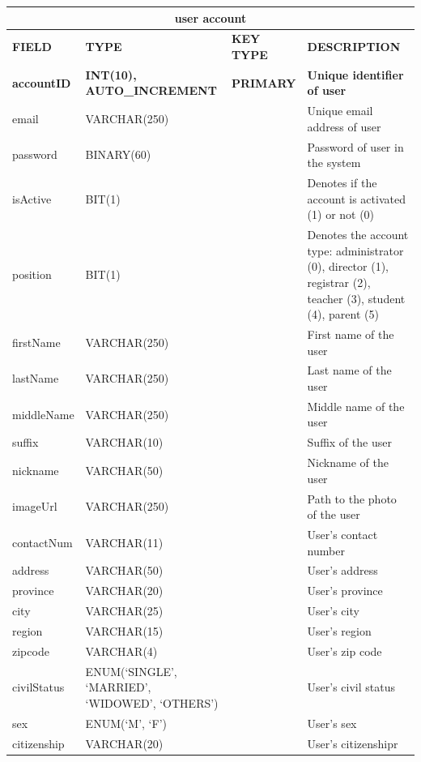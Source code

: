 \documentclass[11pt,a4paper,titlepage]{article}
\begin{document}
\vspace{1cm}
\begin{longtable}{ |p{2.5cm}|p{4.5cm}|p{2.5cm}|p{3cm}|  }
    \hline
    \multicolumn{4}{|c|}{\textbf{user account}} \\
    \hline
    \textbf{FIELD}&\textbf{TYPE}&\textbf{KEY TYPE}&\textbf{DESCRIPTION}\\
    \hline
    \textbf{accountID}   & \textbf{INT(10), AUTO\_INCREMENT}   & \textbf{PRIMARY} & \textbf{Unique identifier of user}\\ \hline
    email & VARCHAR(250) & & Unique email address of user\\ \hline
    password & BINARY(60) & & Password of user in the system \\ \hline
    isActive & BIT(1) & & Denotes if the account is activated (1) or not (0)\\ \hline
    position & BIT(1) & & Denotes the account type: administrator (0), director (1), registrar (2), teacher (3), student (4), parent (5)\\ \hline
    firstName & VARCHAR(250) & & First name of the user \\ \hline
    lastName & VARCHAR(250) & & Last name of the user \\ \hline
    middleName & VARCHAR(250) & & Middle name of the user \\ \hline
    suffix & VARCHAR(10) & & Suffix of the user \\ \hline
    nickname & VARCHAR(50) & & Nickname of the user \\ \hline
    imageUrl & VARCHAR(250) & & Path to the photo of the user \\ \hline
    contactNum & VARCHAR(11) & & User's contact number \\ \hline
    address & VARCHAR(50) & & User's address \\ \hline
    province & VARCHAR(20) & & User's province \\ \hline
    city & VARCHAR(25) & & User's city \\ \hline
    region & VARCHAR(15) & & User's region \\ \hline
    zipcode & VARCHAR(4) & & User's zip code \\ \hline
    civilStatus & ENUM(`SINGLE', `MARRIED', `WIDOWED', `OTHERS') & & User's civil status \\ \hline
    sex & ENUM(`M', `F') & & User's sex \\ \hline
    citizenship & VARCHAR(20) & & User's citizenshipr \\ \hline

\end{longtable}
\end{document}
